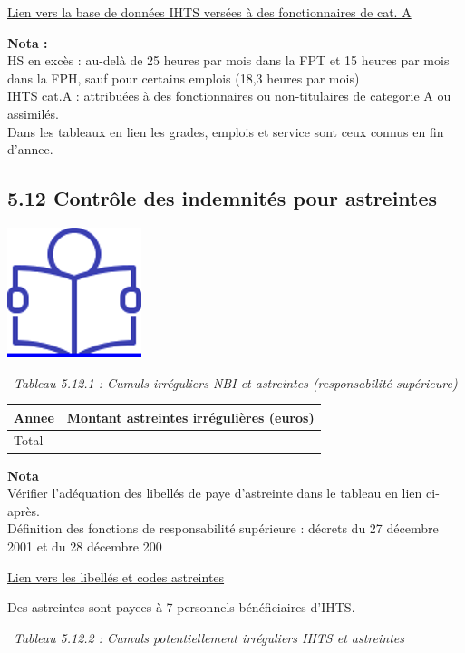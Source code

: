 \href{../Bases/Reglementation/ihts.cat.A.csv}{Lien vers la base de données
IHTS versées à des fonctionnaires de cat. A}

\textbf{Nota :}\\
HS en excès : au-delà de 25 heures par mois dans la FPT et 15 heures par
mois dans la FPH, sauf pour certains emplois (18,3 heures par mois)\\
IHTS cat.A : attribuées à des fonctionnaires ou non-titulaires de
categorie A ou assimilés.\\
Dans les tableaux en lien les grades, emplois et service sont ceux
connus en fin d'annee.

\hypertarget{controle-des-indemnites-pour-astreintes}{%
\subsection{5.12 Contrôle des indemnités pour
astreintes}\label{controle-des-indemnites-pour-astreintes}}

\href{../Docs/Notices/fiche_astreintes.odt}{\includegraphics{icones/Notice.png}}

~\emph{Tableau 5.12.1 : Cumuls irréguliers NBI et astreintes
(responsabilité supérieure)}

\begin{longtable}[]{@{}ll@{}}
\toprule
Annee & Montant astreintes irrégulières (euros)\tabularnewline
\midrule
\endhead
Total &\tabularnewline
\bottomrule
\end{longtable}

\textbf{Nota}\\
Vérifier l'adéquation des libellés de paye d'astreinte dans le tableau
en lien ci-après.\\
Définition des fonctions de responsabilité supérieure : décrets du 27
décembre 2001 et du 28 décembre 200

\href{../Bases/Reglementation/libelles.astreintes.csv}{Lien vers les
libellés et codes astreintes}

Des astreintes sont payees à 7 personnels bénéficiaires d'IHTS.

~\emph{Tableau 5.12.2 : Cumuls potentiellement irréguliers IHTS et
astreintes}

